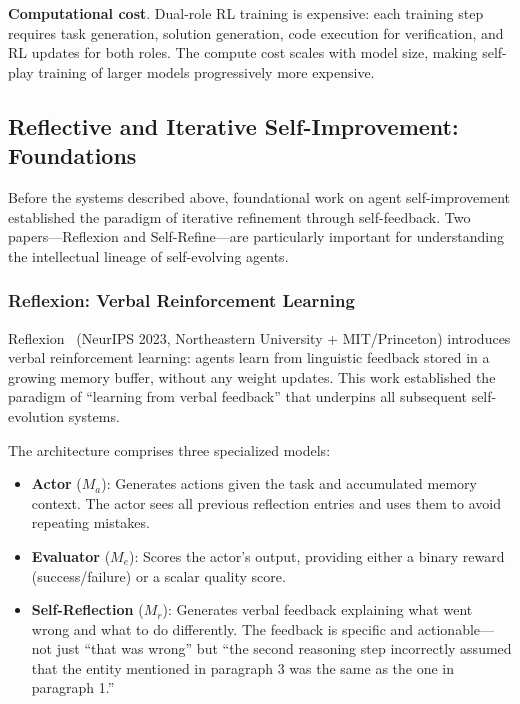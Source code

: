 \textbf{Computational cost}. Dual-role RL training is expensive: each training step requires task generation, solution generation, code execution for verification, and RL updates for both roles. The compute cost scales with model size, making self-play training of larger models progressively more expensive.

\subsection{Reflective and Iterative Self-Improvement: Foundations}
\label{sec:reflection-agents}

Before the systems described above, foundational work on agent self-improvement established the paradigm of iterative refinement through self-feedback. Two papers---Reflexion and Self-Refine---are particularly important for understanding the intellectual lineage of self-evolving agents.

\subsubsection{Reflexion: Verbal Reinforcement Learning}

Reflexion~\citep{shinn2023reflexion} (NeurIPS 2023, Northeastern University + MIT/Princeton) introduces verbal reinforcement learning: agents learn from linguistic feedback stored in a growing memory buffer, without any weight updates. This work established the paradigm of ``learning from verbal feedback'' that underpins all subsequent self-evolution systems.

The architecture comprises three specialized models:
\begin{itemize}
\item \textbf{Actor} ($M_a$): Generates actions given the task and accumulated memory context. The actor sees all previous reflection entries and uses them to avoid repeating mistakes.
\item \textbf{Evaluator} ($M_e$): Scores the actor's output, providing either a binary reward (success/failure) or a scalar quality score.
\item \textbf{Self-Reflection} ($M_r$): Generates verbal feedback explaining what went wrong and what to do differently. The feedback is specific and actionable---not just ``that was wrong'' but ``the second reasoning step incorrectly assumed that the entity mentioned in paragraph 3 was the same as the one in paragraph 1.''
\end{itemize}

